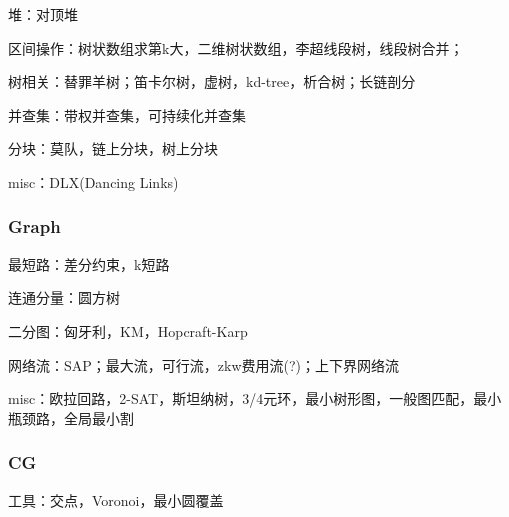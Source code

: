 \begin{todolist}

\item 堆：对顶堆

\item 区间操作：树状数组求第k大，二维树状数组，李超线段树，线段树合并；

\item 树相关：替罪羊树；笛卡尔树，虚树，kd-tree，析合树；长链剖分

\item 并查集：带权并查集，可持续化并查集

\item 分块：莫队，链上分块，树上分块

\item misc：DLX(Dancing Links)

\end{todolist}

\subsubsection{Graph}

\begin{todolist}

\item 最短路：差分约束，k短路

\item 连通分量：圆方树

\item 二分图：匈牙利，KM，Hopcraft-Karp

\item 网络流：SAP；最大流，可行流，zkw费用流(?)；上下界网络流

\item misc：欧拉回路，2-SAT，斯坦纳树，3/4元环，最小树形图，一般图匹配，最小瓶颈路，全局最小割

\end{todolist}

\subsubsection{CG}

\begin{todolist}

\item 工具：交点，Voronoi，最小圆覆盖

\end{todolist}

